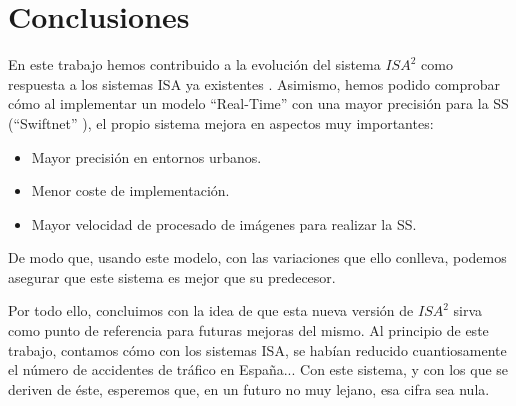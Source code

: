 \chapter{Conclusiones}

En este trabajo hemos contribuido a la evolución del sistema $ISA^{2}$ como respuesta a los sistemas \ac{ISA} ya existentes \cite{isa2}. Asimismo, hemos podido comprobar cómo al implementar un modelo ``Real-Time'' con una mayor precisión para la \ac{SS} (``Swiftnet'' \cite{swiftnet}), el propio sistema mejora en aspectos muy importantes:

\begin{itemize}
\item Mayor precisión en entornos urbanos.
\item Menor coste de implementación.
\item Mayor velocidad de procesado de imágenes para realizar la \ac{SS}.
\end{itemize}

De modo que, usando este modelo, con las variaciones que ello conlleva, podemos asegurar que este sistema es mejor que su predecesor.

Por todo ello, concluimos con la idea de que esta nueva versión de $ISA^{2}$ sirva como punto de referencia para futuras mejoras del mismo. Al principio de este trabajo, contamos cómo con los sistemas \ac{ISA}, se habían reducido cuantiosamente el número de accidentes de tráfico en España... Con este sistema, y con los que se deriven de éste, esperemos que, en un futuro no muy lejano, esa cifra sea nula.